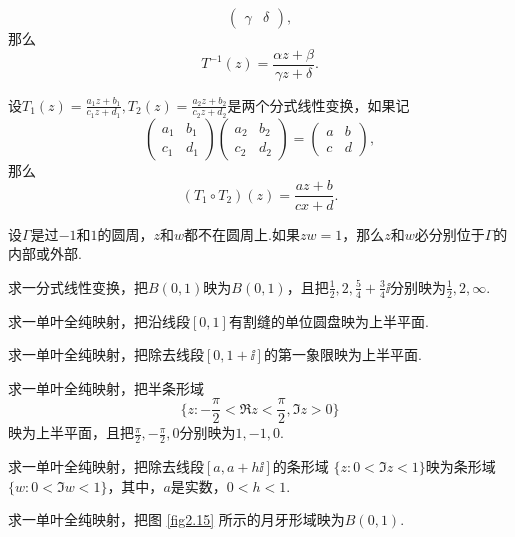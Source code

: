 \begin{xiti}
\[\begin{pmatrix}
      \gamma & \delta
      \end{pmatrix},
    \]
    那么
    \[
      T^{-1}(z) = \frac{\alpha z + \beta}{\gamma z + \delta}.
    \]
  \item 设$T_1(z)=\frac{a_1z+b_1}{c_1z+d_1},T_2(z)=\frac{a_2z+b_2}{c_2z+d_2}$是两个分式线性变换，如果记
    \[
      \begin{pmatrix}
        a_1 & b_1\\
        c_1 & d_1
      \end{pmatrix}
      \begin{pmatrix}
        a_2 & b_2 \\
        c_2 & d_2
      \end{pmatrix}
      = \begin{pmatrix}
      a & b \\
      c & d
      \end{pmatrix},
    \]
  那么
    \[
      (T_1\circ T_2)(z) = \frac{az+b}{cx+d}.
    \]
  \item 设$\Gamma$是过$-1$和$1$的圆周，$z$和$w$都不在圆周上.如果$zw=1$，那么$z$和$w$必分别位于$\Gamma$的内部或外部.
  \item 求一分式线性变换，把$B(0,1)$映为$B(0,1)$，且把$\frac12,2,\frac54+\frac34\ii$分别映为$\frac12,2,\infty$.
  \item 求一单叶全纯映射，把沿线段$[0,1]$有割缝的单位圆盘映为上半平面.
  \item 求一单叶全纯映射，把除去线段$[0,1+\ii]$的第一象限映为上半平面.
  \item 求一单叶全纯映射，把半条形域
    \[
      \bigg\{z:-\frac\pi2 < \Re z < \frac\pi2,\Im z > 0 \bigg\}
    \]
    映为上半平面，且把$\frac\pi2,-\frac\pi2,0$分别映为$1,-1,0$.
  \item 求一单叶全纯映射，把除去线段$[a,a+h\ii]$的条形域
     $\{z:0<\Im z<1\}$映为条形域$\{w:0<\Im w<1\}$，其中，$a$是实数，$0<h<1$.
  \item 求一单叶全纯映射，把图 \ref{fig2.15} 所示的月牙形域映为$B(0,1)$.
    \begin{figure}[!ht]
      \centering
      \begin{minipage}[b]{0.48\linewidth}
        \centering
\end{minipage}
\end{figure}
\end{xiti}
